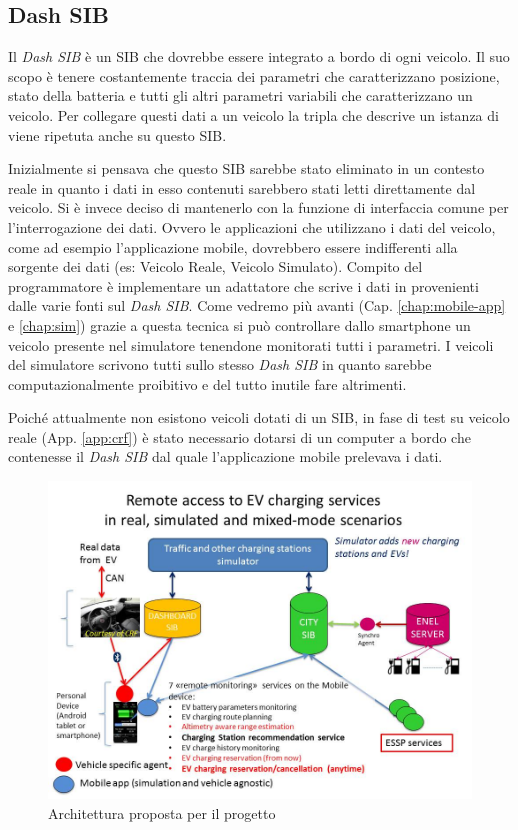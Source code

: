 \subsection{Dash SIB}\label{subsec:dash-sib}

Il \emph{Dash SIB} è  un SIB che dovrebbe essere integrato a bordo di ogni veicolo. Il suo scopo è tenere costantemente traccia dei parametri che caratterizzano posizione, stato della batteria e tutti gli altri parametri variabili che caratterizzano un veicolo. Per collegare questi dati a un veicolo la tripla che descrive un istanza di  viene ripetuta anche su questo SIB. 

Inizialmente si pensava che questo SIB sarebbe stato eliminato in un contesto reale in quanto i dati in esso contenuti sarebbero stati letti direttamente dal veicolo. Si è invece deciso di mantenerlo con la funzione di interfaccia comune per l'interrogazione dei dati. Ovvero le applicazioni che utilizzano i dati del veicolo, come ad esempio l'applicazione mobile, dovrebbero essere indifferenti alla sorgente dei dati (es: Veicolo Reale, Veicolo Simulato). Compito del programmatore è implementare un adattatore che scrive i dati in provenienti dalle varie fonti sul \emph{Dash SIB}. Come vedremo più avanti (Cap. \ref{chap:mobile-app} e \ref{chap:sim}) grazie a questa tecnica si può controllare dallo smartphone un veicolo presente nel simulatore tenendone monitorati tutti i parametri. I veicoli del simulatore scrivono tutti sullo stesso \emph{Dash SIB} in quanto sarebbe computazionalmente proibitivo e del tutto inutile fare altrimenti.

Poiché attualmente non esistono veicoli dotati di un SIB, in fase di test su veicolo reale (App. \ref{app:crf}) è stato necessario dotarsi di un computer a bordo che contenesse il \emph{Dash SIB} dal quale l'applicazione mobile prelevava i dati.

\begin{figure}[H]
	\centering
	\includegraphics[width=1.0\textwidth]{assets/software-architecture.jpg}
	\caption{Architettura proposta per il progetto}
	\label{fig:proj-sib-arch}
\end{figure}

